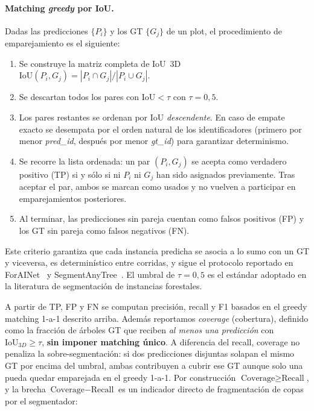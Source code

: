 \documentclass[runningheads]{llncs}
\begin{document}
\paragraph{Matching \emph{greedy} por IoU.}
Dadas las predicciones $\{P_i\}$ y los GT $\{G_j\}$ de un plot, el procedimiento de emparejamiento es el siguiente:
\begin{enumerate}
  \item Se construye la matriz completa de IoU~3D $\mathrm{IoU}(P_i, G_j) = |P_i \cap G_j| / |P_i \cup G_j|$.
  \item Se descartan todos los pares con $\mathrm{IoU} < \tau$ con $\tau = 0{,}5$.
  \item Los pares restantes se ordenan por IoU \emph{descendente}. En caso de empate exacto se desempata por el orden natural de los identificadores (primero por menor \emph{pred\_id}, despu\'es por menor \emph{gt\_id}) para garantizar determinismo.
  \item Se recorre la lista ordenada: un par $(P_i, G_j)$ se acepta como verdadero positivo (TP) si y s\'olo si ni $P_i$ ni $G_j$ han sido asignados previamente. Tras aceptar el par, ambos se marcan como usados y no vuelven a participar en emparejamientos posteriores.
  \item Al terminar, las predicciones sin pareja cuentan como falsos positivos (FP) y los GT sin pareja como falsos negativos (FN).
\end{enumerate}
Este criterio garantiza que cada instancia predicha se asocia a lo sumo con un GT y viceversa, es determin\'istico entre corridas, y sigue el protocolo reportado en ForAINet~\cite{henrich2024} y SegmentAnyTree~\cite{wielgosz2024}. El umbral de $\tau = 0{,}5$ es el est\'andar adoptado en la literatura de segmentaci\'on de instancias forestales.

A partir de TP, FP y FN se computan precisi\'on, recall y F1 basados en el greedy matching 1-a-1 descrito arriba. Adem\'as reportamos \emph{coverage} (cobertura), definido como la fracci\'on de \'arboles GT que reciben \emph{al menos una predicci\'on} con $\text{IoU}_{3D} \geq \tau$, \textbf{sin imponer matching \'unico}. A diferencia del recall, coverage no penaliza la sobre-segmentaci\'on: si dos predicciones disjuntas solapan el mismo GT por encima del umbral, ambas contribuyen a cubrir ese GT aunque solo una pueda quedar emparejada en el greedy 1-a-1. Por construcci\'on $\text{Coverage} \geq \text{Recall}$, y la brecha $\text{Coverage} - \text{Recall}$ es un indicador directo de fragmentaci\'on de copas por el segmentador:
\end{document}
